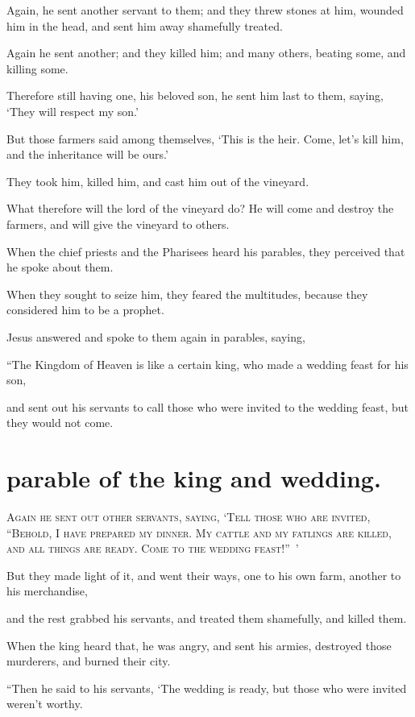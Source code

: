 Again, he sent another servant to them; and they threw stones at him, wounded him in the head, and sent him away shamefully treated.

Again he sent another; and they killed him; and many others, beating some, and killing some.

Therefore still having one, his beloved son, he sent him last to them, saying, ‘They will respect my son.’

But those farmers said among themselves, ‘This is the heir. Come, let’s kill him, and the inheritance will be ours.’

They took him, killed him, and cast him out of the vineyard.

What therefore will the lord of the vineyard do? He will come and destroy the farmers, and will give the vineyard to others.

When the chief priests and the Pharisees heard his parables, they perceived that he spoke about them.

When they sought to seize him, they feared the multitudes, because they considered him to be a prophet.

Jesus answered and spoke to them again in parables, saying,

“The Kingdom of Heaven is like a certain king, who made a wedding feast for his son,

and sent out his servants to call those who were invited to the wedding feast, but they would not come.


\clearpage \section*{parable of the king and wedding.}

\lettrine{A}{gain he sent out other servants, saying, ‘Tell those who are invited, “Behold, I have prepared my dinner. My cattle and my fatlings are killed, and all things are ready. Come to the wedding feast!” ’}

But they made light of it, and went their ways, one to his own farm, another to his merchandise,

and the rest grabbed his servants, and treated them shamefully, and killed them.

When the king heard that, he was angry, and sent his armies, destroyed those murderers, and burned their city.

“Then he said to his servants, ‘The wedding is ready, but those who were invited weren’t worthy.

